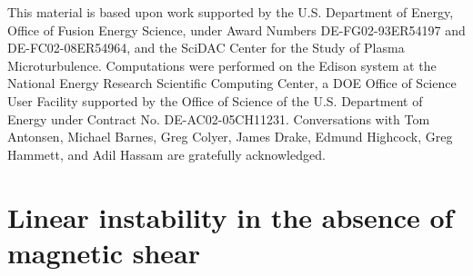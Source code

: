 \documentclass{jpp}
\begin{document}

This material is based upon work supported by the U.S. Department of
Energy, Office of Fusion Energy Science, under Award Numbers
DE-FG02-93ER54197 and DE-FC02-08ER54964, and the SciDAC Center for the
Study of Plasma Microturbulence.  Computations were performed on the
Edison system at the National Energy Research Scientific Computing
Center, a DOE Office of Science User Facility supported by the Office
of Science of the U.S. Department of Energy under Contract
No. DE-AC02-05CH11231.  Conversations with Tom Antonsen, Michael
Barnes, Greg Colyer, James Drake, Edmund Highcock, Greg Hammett, and
Adil Hassam are gratefully acknowledged.


\appendix

\section{Linear instability in the absence of magnetic shear}
\label{appendix:zeroShear}
\end{document}
